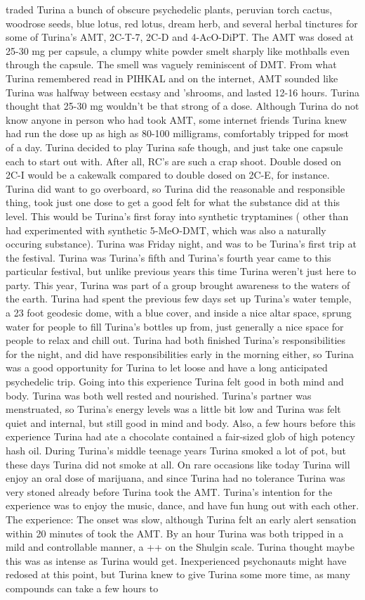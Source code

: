 \documentclass[12pt]{book}
\begin{document}
traded Turina a bunch of obscure psychedelic plants, peruvian torch cactus, woodrose seeds, blue lotus, red lotus, dream herb, and several herbal tinctures for some of Turina's AMT, 2C-T-7, 2C-D and 4-AcO-DiPT. The AMT was dosed at 25-30 mg per capsule, a clumpy white powder smelt sharply like mothballs even through the capsule. The smell was vaguely reminiscent of DMT. From what Turina remembered read in PIHKAL and on the internet, AMT sounded like Turina was halfway between ecstasy and 'shrooms, and lasted 12-16 hours. Turina thought that 25-30 mg wouldn't be that strong of a dose. Although Turina do not know anyone in person who had took AMT, some internet friends Turina knew had run the dose up as high as 80-100 milligrams, comfortably tripped for most of a day. Turina decided to play Turina safe though, and just take one capsule each to start out with. After all, RC's are such a crap shoot. Double dosed on 2C-I would be a cakewalk compared to double dosed on 2C-E, for instance. Turina did want to go overboard, so Turina did the reasonable and responsible thing, took just one dose to get a good felt for what the substance did at this level. This would be Turina's first foray into synthetic tryptamines ( other than had experimented with synthetic 5-MeO-DMT, which was also a naturally occuring substance). Turina was Friday night, and was to be Turina's first trip at the festival. Turina was Turina's fifth and Turina's fourth year came to this particular festival, but unlike previous years this time Turina weren't just here to party. This year, Turina was part of a group brought awareness to the waters of the earth. Turina had spent the previous few days set up Turina's water temple, a 23 foot geodesic dome, with a blue cover, and inside a nice altar space, sprung water for people to fill Turina's bottles up from, just generally a nice space for people to relax and chill out. Turina had both finished Turina's responsibilities for the night, and did have responsibilities early in the morning either, so Turina was a good opportunity for Turina to let loose and have a long anticipated psychedelic trip. Going into this experience Turina felt good in both mind and body. Turina was both well rested and nourished. Turina's partner was menstruated, so Turina's energy levels was a little bit low and Turina was felt quiet and internal, but still good in mind and body. Also, a few hours before this experience Turina had ate a chocolate contained a fair-sized glob of high potency hash oil. During Turina's middle teenage years Turina smoked a lot of pot, but these days Turina did not smoke at all. On rare occasions like today Turina will enjoy an oral dose of marijuana, and since Turina had no tolerance Turina was very stoned already before Turina took the AMT. Turina's intention for the experience was to enjoy the music, dance, and have fun hung out with each other. The experience: The onset was slow, although Turina felt an early alert sensation within 20 minutes of took the AMT. By an hour Turina was both tripped in a mild and controllable manner, a ++ on the Shulgin scale. Turina thought maybe this was as intense as Turina would get. Inexperienced psychonauts might have redosed at this point, but Turina knew to give Turina some more time, as many compounds can take a few hours to 
\end{document}
